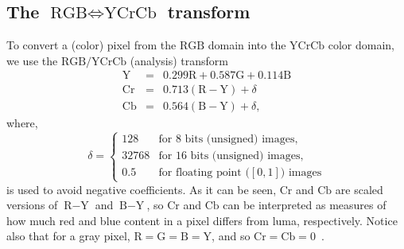 \subsection{The $\text{RGB} \Leftrightarrow \text{YCrCb}$ transform}
To convert a (color) pixel from the $\text{RGB}$ domain into the
\href{https://en.wikipedia.org/wiki/YCbCr}{$\text{YCrCb}$} color
domain, we use the $\text{RGB/YCrCb}$ (analysis)
transform~\cite{malvar2008lifting}
\begin{equation}
  \begin{array}{lcl}
    \text{Y}  & = & 0.299\text{R} + 0.587\text{G} + 0.114\text{B} \\
    \text{Cr} & = & 0.713(\text{R} - \text{Y}) + \delta \\
    \text{Cb} & = & 0.564(\text{B} - \text{Y}) + \delta,
  \end{array}
  \label{eq:alternative_YCrCb}
\end{equation}
where,
\begin{equation}
  \delta = \left\{
  \begin{array}{ll}
    128 & \text{for 8 bits (unsigned) images},\\
    32768 & \text{for 16 bits (unsigned) images},\\
    0.5 & \text{for floating point (}[0,1]\text{) images}
  \end{array}
  \right.
\end{equation}
is used to avoid negative coefficients. As it can be seen, $\text{Cr}$
and $\text{Cb}$ are scaled versions of $\text{R} - \text{Y}$ and
$\text{B} - \text{Y}$, so $\text{Cr}$ and $\text{Cb}$ can be
interpreted as measures of how much red and blue content in a pixel
differs from luma, respectively. Notice also that for a gray pixel,
$\text{R}=\text{G}=\text{B}=\text{Y}$, and so
$\text{Cr}=\text{Cb}=0$~\cite{malvar2008lifting}.
\begin{comment}
\begin{equation}
  \begin{bmatrix}
    \text{Y} \\
    \text{Cr} \\
    \text{Cb}
  \end{bmatrix}
  =
  \begin{bmatrix}
    0.299   &   0.587 & 0.114 \\ 
    0.5     & -0.4187 & -0.0813 \\
    -0.1687 & -0.3313 & 0.5
  \end{bmatrix}
  \begin{bmatrix}
    \text{R} \\
    \text{G} \\
    \text{B}
  \end{bmatrix},
  \label{eq:YCrCb}
\end{equation}
\end{comment}
